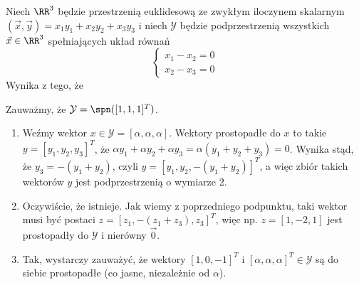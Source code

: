 \begin{solutions}
    \sol Niech $\RR^3$ będzie przestrzenią euklidesową ze zwykłym iloczynem skalarnym $(\vec{x}, \vec{y}) = x_1y_1 + x_2y_2 + x_3y_3$ i niech $\mathcal{Y}$ będzie podprzestrzenią wszystkich $\vec{x}\in\RR^3$ spełniających układ równań
    $$
    \begin{cases}
        x_1 - x_2 = 0 \\
        x_2 - x_3 = 0
    \end{cases}
    $$
    Wynika z tego, że
    
    Zauważmy, że $\mathcal{Y}=\spn([1,1,1]^T)$.

    \begin{enumerate}[\bf A.]
        \item Weźmy wektor $x\in\mathcal{Y}=[\alpha,\alpha,\alpha]$. Wektory prostopadłe do $x$ to takie $y=[y_1,y_2,y_3]^T$, że $\alpha y_1 + \alpha y_2 + \alpha y_3 = \alpha(y_1 + y_2 + y_3) = 0$. Wynika stąd, że $y_3 = -(y_1 + y_2)$, czyli $y=[y_1,y_2,-(y_1+y_2)]^T$, a więc zbiór takich wektorów $y$ jest podprzestrzenią o wymiarze 2.

        \item Oczywiście, że istnieje. Jak wiemy z poprzedniego podpunktu, taki wektor musi być postaci $z=[z_1,-(z_1+z_3),z_3]^T$, więc np. $z=[1,-2,1]$ jest prostopadły do $\mathcal{Y}$ i nierówny $\vec{0}$.

        \item Tak, wystarczy zauważyć, że wektory $[1,0,-1]^T$ i $[\alpha, \alpha, \alpha]^T \in \mathcal{Y}$ są do siebie prostopadłe (co jasne, niezależnie od $\alpha$).
    \end{enumerate}
\end{solutions}
